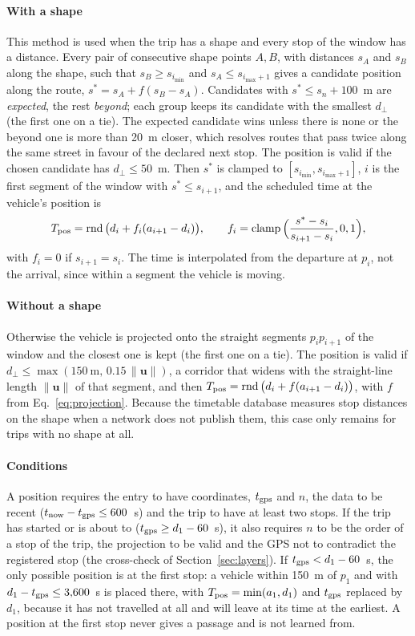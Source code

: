 \paragraph{With a shape} This method is used when the trip has a shape and every stop of the window has a distance.
Every pair of consecutive shape points $A,B$, with distances $s_A$ and $s_B$ along the shape, such that
$s_B\ge s_{i_{\min}}$ and $s_A\le s_{i_{\max}+1}$ gives a candidate position along the route,
$s^\ast=s_A+f(s_B-s_A)$. Candidates with $s^\ast\le s_n+100$~m are \emph{expected}, the rest \emph{beyond}; each group
keeps its candidate with the smallest $d_\perp$ (the first one on a tie). The expected candidate wins unless there is
none or the beyond one is more than 20~m closer, which resolves routes that pass twice along the same street in
favour of the declared next stop. The position is valid if the chosen candidate has $d_\perp\le50$~m. Then $s^\ast$
is clamped to $[s_{i_{\min}},s_{i_{\max}+1}]$, $i$ is the first segment of the window with $s^\ast\le s_{i+1}$, and
the scheduled time at the vehicle's position is
\begin{equation}
T_{\mathrm{pos}}=\operatorname{rnd}\big(d_i+f_i(a_{i+1}-d_i)\big),\qquad f_i=\operatorname{clamp}\Big(\frac{s^\ast-s_i}{s_{i+1}-s_i},0,1\Big),
\label{eq:tpos}
\end{equation}
with $f_i=0$ if $s_{i+1}=s_i$. The time is interpolated from the departure at $p_i$, not the arrival, since within a
segment the vehicle is moving.

\paragraph{Without a shape} Otherwise the vehicle is projected onto the straight segments $p_ip_{i+1}$ of the window
and the closest one is kept (the first one on a tie). The position is valid if
$d_\perp\le\max(150~\text{m},\,0.15\,\|\mathbf u\|)$, a corridor that widens with the straight-line length
$\|\mathbf u\|$ of that segment, and then $T_{\mathrm{pos}}=\operatorname{rnd}\big(d_i+f(a_{i+1}-d_i)\big)$, with $f$ from
Eq.~\eqref{eq:projection}. Because the timetable database measures stop distances on the shape when a network does
not publish them, this case only remains for trips with no shape at all.

\paragraph{Conditions} A position requires the entry to have coordinates, $t_{\mathrm{gps}}$ and $n$, the data to be recent
($t_{\mathrm{now}}-t_{\mathrm{gps}}\le600$~s) and the trip to have at least two stops. If the trip has started or is about to
($t_{\mathrm{gps}}\ge d_1-60$~s), it also requires $n$ to be the order of a stop of the trip, the projection to be valid and the
GPS not to contradict the registered stop (the cross-check of Section~\ref{sec:layers}). If $t_{\mathrm{gps}}<d_1-60$~s, the
only possible position is at the first stop: a vehicle within 150~m of $p_1$ and with $d_1-t_{\mathrm{gps}}\le3{,}600$~s is
placed there, with $T_{\mathrm{pos}}=\min(a_1,d_1)$ and $t_{\mathrm{gps}}$ replaced by $d_1$, because it has not travelled at all and will
leave at its time at the earliest. A position at the first stop never gives a passage and is not learned from.

